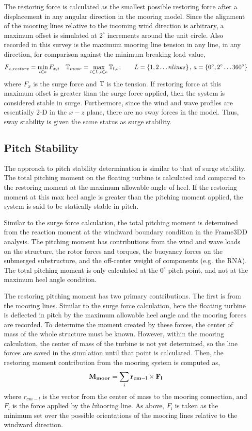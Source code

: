 The restoring force is calculated as the smallest possible restoring
force after a displacement in any angular direction in the mooring
model.  Since the alignment of the mooring lines relative to the
incoming wind direction is arbitrary, a maximum offset is simulated at
$2^{\circ}$ increments around the unit circle. Also recorded in this
survey is the maximum mooring line tension in any
line, in any direction, for comparison against the minimum breaking load
value,
\[
  F_{x,restore} = \min_{i\in a} F_{x,i}\quad \mathbb{T}_{moor} = \max_{l\in L,i\in a} \mathbb{T}_{l,i}\,;
\qquad L=\left\{1,2\ldots nlines\right\}, \, a= \left\{0^{\circ}, 2^{\circ}\ldots 360^{\circ}\right\}
\]
where $F_x$ is the surge force and $\mathbb{T}$ is the tension.  If
restoring force at this maximum offset is greater than the surge force
applied, then the system is considered stable in surge.  Furthermore,
since the wind and wave profiles are essentially 2-D in the $x-z$ plane,
there are no sway forces in the model.  Thus, sway stability is given
the same status as surge stability.


\subsection{Pitch Stability}
The approach to pitch stability determination is similar to that of
surge stability.  The total pitching moment on the floating turbine is
calculated and compared to the restoring moment at the maximum allowable
angle of heel.  If the restoring moment at this max heel angle is
greater than the pitching moment applied, the system is said to be
statically stable in pitch.

Similar to the surge force calculation, the total pitching moment is
determined from the reaction moment at the windward boundary condition
in the Frame3DD analysis.  The pitching moment has contributions from
the wind and wave loads on the structure, the rotor forces and torques,
the buoyancy forces on the submerged substructure, and the off-center
weight of components (e.g. the RNA).  The total pitching moment is only
calculated at the $0^{\circ}$ pitch point, and not at the maximum heel
angle condition.

The restoring pitching moment has two primary contributions.  The first
is from the mooring lines.  Similar to the surge force calculation, here
the floating turbine is deflected in pitch by the maximum allowable heel
angle and the mooring forces are recorded.  To determine the moment
created by these forces, the center of mass of the whole structure must
be known.  However, within the mooring calculation, the center of mass
of the turbine is not yet determined, so the line forces are saved in
the simulation until that point is calculated.  Then, the restoring moment
contribution from the mooring system is computed as,
\[
  \mathbf{M_{moor}} = \sum_i \mathbf{r_{cm-l}} \times \mathbf{F_l}
\]
where $r_{cm-l}$ is the vector from the center of mass to the mooring
connection, and $F_l$ is the force applied by the $l$\th\~mooring
line.  As above, $F_l$ is taken as the minimum set over the possible
orientations of the mooring lines relative to the windward direction.

